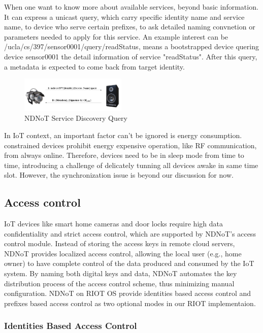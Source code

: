 \documentclass[sigconf]{acmart}
\begin{document}
When one want to know more about available services, beyond basic information. It can express a unicast query, which carry specific identity name and service name, 
to device who serve certain prefixes, to ask detailed naming convnetion or parameters needed to apply for this service. An example interest can be 
/ucla/cs/397/sensor0001/query/readStatus, means a bootstrapped device quering device sensor0001 the detail information of service "readStatus". After this query, 
a metadata is expected to come back from target identity.

\begin{figure}[h]
	\vspace{-0.1cm}
	\centering
	\includegraphics[width=0.45\textwidth]{figures/service-discovery-query}
	\caption{NDNoT Service Discovery Query}
	\vspace{-0.1cm}
	\label{fig:servicediscovery-query}
\end{figure}

In IoT context, an important factor can't be ignored is energy consumption. constrained devices prohibit energy expensive operation, like RF communication, 
from always online. Therefore, devices need to be in sleep mode from time to time, introducing a challenge of delicately tunning all devices awake in same time slot.
However, the synchronization issue is beyond our discussion for now. 

\subsection{Access control}
IoT devices like smart home cameras and door locks require high data confidentiality and strict access control, which are supported by NDNoT's access control module.
Instead of storing the access keys in remote cloud servers, NDNoT provides localized access control, allowing the local user (e.g., home owner) to have complete control of the data produced and consumed by the IoT system.
By naming both digital keys and data, NDNoT automates the key distribution process of the access control scheme, thus minimizing manual configuration.
NDNoT on RIOT OS provide identities based access control and prefixes based access control as two optional modes in our RIOT implementaion. 

\subsubsection{Identities Based Access Control}
\end{document}
